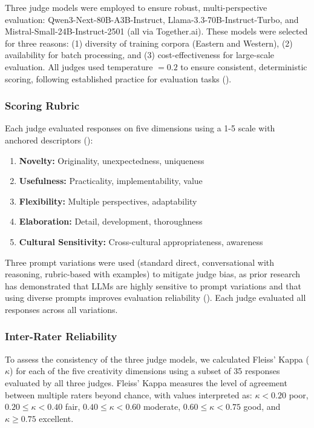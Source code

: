 \documentclass{article}
\begin{document}
Three judge models were employed to ensure robust, multi-perspective evaluation: Qwen3-Next-80B-A3B-Instruct, Llama-3.3-70B-Instruct-Turbo, and Mistral-Small-24B-Instruct-2501 (all via Together.ai). These models were selected for three reasons: (1) diversity of training corpora (Eastern and Western), (2) availability for batch processing, and (3) cost-effectiveness for large-scale evaluation. All judges used temperature $= 0.2$ to ensure consistent, deterministic scoring, following established practice for evaluation tasks (\cite{tiannan_wang_d1534114}).

\subsubsection{Scoring Rubric}

Each judge evaluated responses on five dimensions using a 1-5 scale with anchored descriptors (\cite{haririLLMCreativityMeasuringExplaining2025}):

\begin{enumerate}
    \item \textbf{Novelty:} Originality, unexpectedness, uniqueness
    \item \textbf{Usefulness:} Practicality, implementability, value
    \item \textbf{Flexibility:} Multiple perspectives, adaptability
    \item \textbf{Elaboration:} Detail, development, thoroughness
    \item \textbf{Cultural Sensitivity:} Cross-cultural appropriateness, awareness
\end{enumerate}

Three prompt variations were used (standard direct, conversational with reasoning, rubric-based with examples) to mitigate judge bias, as prior research has demonstrated that LLMs are highly sensitive to prompt variations and that using diverse prompts improves evaluation reliability (\cite{rem_hida_f636adf1, hui_wei_3d8324a2}). Each judge evaluated all responses across all variations.

\subsubsection{Inter-Rater Reliability}

To assess the consistency of the three judge models, we calculated Fleiss' Kappa (\(\kappa\)) for each of the five creativity dimensions using a subset of 35 responses evaluated by all three judges. Fleiss' Kappa measures the level of agreement between multiple raters beyond chance, with values interpreted as: \(\kappa < 0.20\) poor, \(0.20 \leq \kappa < 0.40\) fair, \(0.40 \leq \kappa < 0.60\) moderate, \(0.60 \leq \kappa < 0.75\) good, and \(\kappa \geq 0.75\) excellent.
\end{document}
